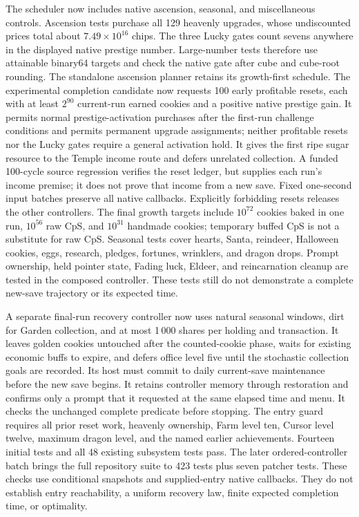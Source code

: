 \documentclass[11pt,a4paper]{article}
\numberwithin{equation}{section}
\theoremstyle{definition}
\theoremstyle{remark}
\begin{document}
The scheduler now includes native ascension, seasonal, and miscellaneous controls. Ascension tests purchase all 129 heavenly upgrades, whose undiscounted prices total about $7.49\times10^{16}$ chips. The three Lucky gates count sevens anywhere in the displayed native prestige number. Large-number tests therefore use attainable binary64 targets and check the native gate after cube and cube-root rounding. The standalone ascension planner retains its growth-first schedule. The experimental completion candidate now requests 100 early profitable resets, each with at least $2^{90}$ current-run earned cookies and a positive native prestige gain. It permits normal prestige-activation purchases after the first-run challenge conditions and permits permanent upgrade assignments; neither profitable resets nor the Lucky gates require a general activation hold. It gives the first ripe sugar resource to the Temple income route and defers unrelated collection. A funded 100-cycle source regression verifies the reset ledger, but supplies each run's income premise; it does not prove that income from a new save. Fixed one-second input batches preserve all native callbacks. Explicitly forbidding resets releases the other controllers. The final growth targets include $10^{72}$ cookies baked in one run, $10^{56}$ raw CpS, and $10^{31}$ handmade cookies; temporary buffed CpS is not a substitute for raw CpS. Seasonal tests cover hearts, Santa, reindeer, Halloween cookies, eggs, research, pledges, fortunes, wrinklers, and dragon drops. Prompt ownership, held pointer state, Fading luck, Eldeer, and reincarnation cleanup are tested in the composed controller. These tests still do not demonstrate a complete new-save trajectory or its expected time.

A separate final-run recovery controller now uses natural seasonal windows, dirt for Garden collection, and at most 1\,000 shares per holding and transaction. It leaves golden cookies untouched after the counted-cookie phase, waits for existing economic buffs to expire, and defers office level five until the stochastic collection goals are recorded. Its host must commit to daily current-save maintenance before the new save begins. It retains controller memory through restoration and confirms only a prompt that it requested at the same elapsed time and menu. It checks the unchanged complete predicate before stopping. The entry guard requires all prior reset work, heavenly ownership, Farm level ten, Cursor level twelve, maximum dragon level, and the named earlier achievements. Fourteen initial tests and all 48 existing subsystem tests pass. The later ordered-controller batch brings the full repository suite to 423 tests plus seven patcher tests. These checks use conditional snapshots and supplied-entry native callbacks. They do not establish entry reachability, a uniform recovery law, finite expected completion time, or optimality.
\end{document}
